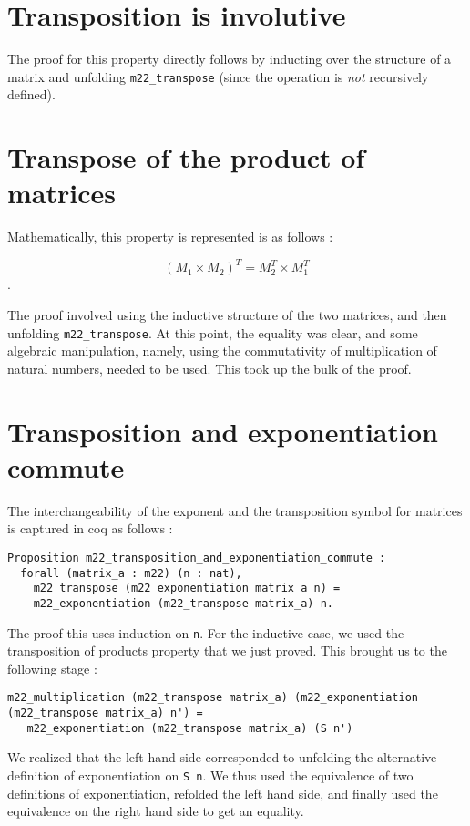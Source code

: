 \documentclass[12pt, a4paper]{article}
\begin{document}
\section {Transposition is involutive}
The proof for this property directly follows by inducting over the structure of
a matrix and unfolding \verb-m22_transpose- (since the operation is \textit{not}
recursively defined).

\section {Transpose of the product of matrices}

Mathematically, this property is represented is as follows :

$$ (M_1 \times M_2)^T = M_2^T \times M_1^T $$. 

The proof involved using the inductive structure of the two matrices, and then 
unfolding \verb-m22_transpose-. At this point, the equality was clear, and some
algebraic manipulation, namely, using the commutativity of multiplication of natural
numbers, needed to be used. This took up the bulk of the proof. 

\section {Transposition and exponentiation commute}

The interchangeability of the exponent and the transposition symbol for matrices 
is captured in coq as follows :

\begin{lstlisting}
Proposition m22_transposition_and_exponentiation_commute :
  forall (matrix_a : m22) (n : nat),
    m22_transpose (m22_exponentiation matrix_a n) =
    m22_exponentiation (m22_transpose matrix_a) n.
\end{lstlisting}

The proof this uses induction on \verb-n-. For the inductive case, we used the 
transposition of products property that we just proved. This brought us to the 
following stage : 

\begin{lstlisting}
m22_multiplication (m22_transpose matrix_a) (m22_exponentiation (m22_transpose matrix_a) n') =
   m22_exponentiation (m22_transpose matrix_a) (S n')
\end{lstlisting}

We realized that the left hand side corresponded to unfolding
the alternative definition of exponentiation on \verb-S n-. We thus used the
equivalence of two definitions of exponentiation, refolded the left hand side, and
finally used the equivalence on the right hand side to get an equality.
\end{document}

